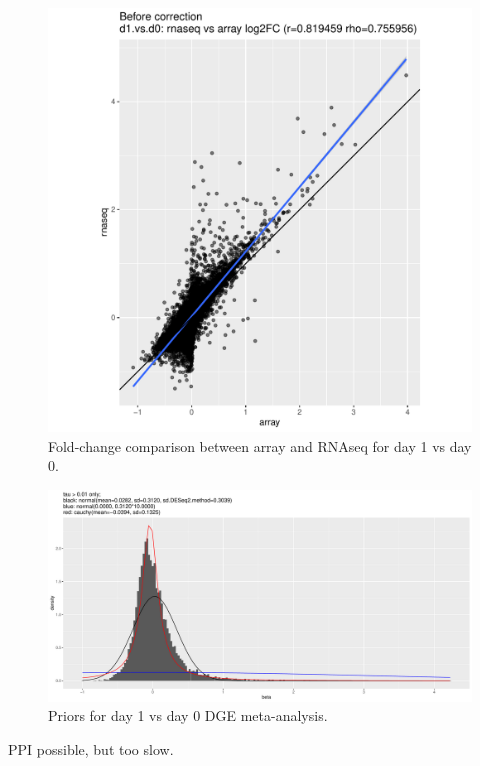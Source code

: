 \begin{figure}
    \includegraphics[width=1.0\textwidth]{mainmatter/figures/chapter_02/meta.rnaseqVsArray.log2FC.beforeBiasCorrection.coefName_d1.vs.d0.pdf}
    \caption{Fold-change comparison between array and RNAseq for day 1 vs day 0.}
\end{figure}

\begin{figure}
    \includegraphics[width=1.0\textwidth]{mainmatter/figures/chapter_02/meta.bayesmeta.priors.coefName_d1.vs.d0.pdf}
    \caption{Priors for day 1 vs day 0 DGE meta-analysis.}
\end{figure}

PPI possible, but too slow.

